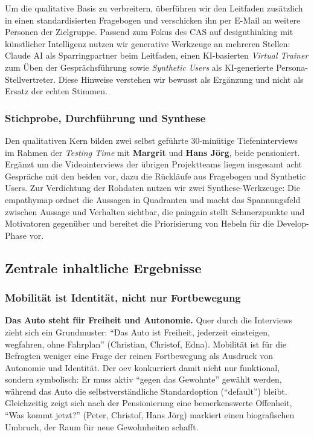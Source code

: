 Um die qualitative Basis zu verbreitern, überführen wir den Leitfaden zusätzlich in einen standardisierten Fragebogen und verschicken ihn per E-Mail an weitere Personen der Zielgruppe. Passend zum Fokus des CAS auf \gls{designthinking} mit künstlicher Intelligenz nutzen wir generative Werkzeuge an mehreren Stellen: Claude AI als Sparringpartner beim Leitfaden, einen KI-basierten \emph{Virtual Trainer} zum Üben der Gesprächsführung sowie \emph{Synthetic Users} als KI-generierte Persona-Stellvertreter. Diese Hinweise verstehen wir bewusst als Ergänzung und nicht als Ersatz der echten Stimmen.

\subsubsection{Stichprobe, Durchführung und Synthese}

Den qualitativen Kern bilden zwei selbst geführte 30-minütige Tiefeninterviews im Rahmen der \emph{Testing Time} mit \textbf{Margrit} und \textbf{Hans Jörg}, beide pensioniert. Ergänzt um die Videointerviews der übrigen Projektteams liegen insgesamt acht Gespräche mit den beiden vor, dazu die Rückläufe aus Fragebogen und Synthetic Users. Zur Verdichtung der Rohdaten nutzen wir zwei Synthese-Werkzeuge: Die \gls{empathymap} ordnet die Aussagen in Quadranten und macht das Spannungsfeld zwischen Aussage und Verhalten sichtbar, die \gls{paingain} stellt Schmerzpunkte und Motivatoren gegenüber und bereitet die Priorisierung von Hebeln für die Develop-Phase vor.

\columnbreak
\subsection{Zentrale inhaltliche Ergebnisse}

\subsubsection{Mobilität ist Identität, nicht nur Fortbewegung}

\textbf{Das Auto steht für Freiheit und Autonomie.} Quer durch die Interviews zieht sich ein Grundmuster: ``Das Auto ist Freiheit, jederzeit einsteigen, wegfahren, ohne Fahrplan'' (Christian, Christof, Edna). Mobilität ist für die Befragten weniger eine Frage der reinen Fortbewegung als Ausdruck von Autonomie und Identität. Der \gls{oev} konkurriert damit nicht nur funktional, sondern symbolisch: Er muss aktiv ``gegen das Gewohnte'' gewählt werden, während das Auto die selbstverständliche Standardoption (``default'') bleibt. Gleichzeitig zeigt sich nach der Pensionierung eine bemerkenswerte Offenheit, ``Was kommt jetzt?'' (Peter, Christof, Hans Jörg) markiert einen biografischen Umbruch, der Raum für neue Gewohnheiten schafft.

